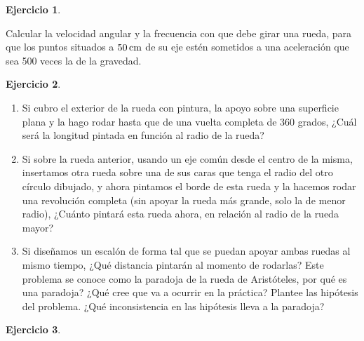 \documentclass[a4paper,12pt,twoside]{book}
\newtheorem{ejercicio}{{Ejercicio}}[chapter]
\begin{document}
\begin{mdframed}[style=ejercicio-facil]
    \begin{ejercicio}
    \end{ejercicio}
    Calcular la velocidad angular y la frecuencia con que debe girar una rueda, para que los puntos situados a $50 \, \si{\centi\metre}$ de su eje estén sometidos a una aceleración que sea 500 veces la de la gravedad.
\end{mdframed}

\begin{mdframed}[style=ejercicio-conceptual]
    \begin{ejercicio}
    \end{ejercicio}
    \begin{center}
        \def\svgwidth{0.6\linewidth}
        
    \end{center}
    \begin{enumerate}
        \item Si cubro el exterior de la rueda con pintura, la apoyo sobre una superficie plana y la hago rodar hasta que de una vuelta completa de 360 grados, ¿Cuál será la longitud pintada en función al radio de la rueda?
        \item Si sobre la rueda anterior, usando un eje común desde el centro de la misma, insertamos otra rueda sobre una de sus caras que tenga el radio del otro círculo dibujado, y ahora pintamos el borde de esta rueda y la hacemos rodar una revolución completa (sin apoyar la rueda más grande, solo la de menor radio), ¿Cuánto pintará esta rueda ahora, en relación al radio de la rueda mayor?
        \item Si diseñamos un escalón de forma tal que se puedan apoyar ambas ruedas al mismo tiempo, ¿Qué distancia pintarán al momento de rodarlas? Este problema se conoce como la paradoja de la rueda de Aristóteles, por qué es una paradoja? ¿Qué cree que va a ocurrir en la práctica? Plantee las hipótesis del problema. ¿Qué inconsistencia en las hipótesis lleva a la paradoja?
    \end{enumerate}
\end{mdframed}

\begin{mdframed}[style=ejercicio-facil]
    \begin{ejercicio}
    \end{ejercicio}
\end{mdframed}
\end{document}
